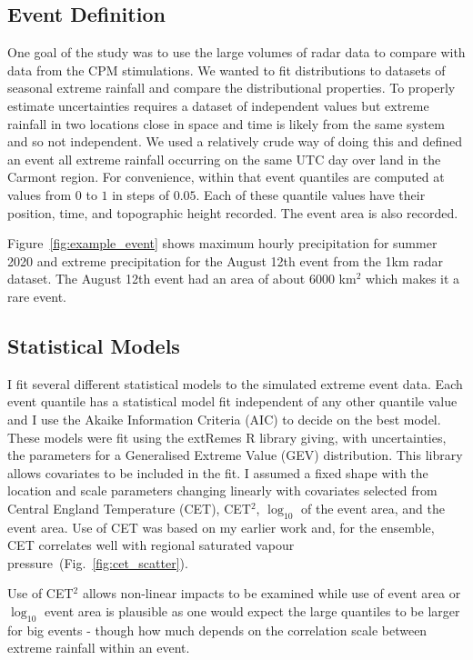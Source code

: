 \documentclass[11pt,a4paper]{article}
\begin{document}
\subsection{Event Definition}

One goal of the study was to use the large volumes of radar data to compare with data from the CPM stimulations. We  wanted  to fit distributions to  datasets of seasonal extreme rainfall and compare the distributional properties. To properly estimate uncertainties requires a dataset of independent values but extreme rainfall in two locations close in space and time is likely from the same system and so not independent. We used a relatively crude way of doing this and defined an event  all extreme rainfall occurring on the same UTC day over land in the Carmont region.  For convenience, within that event quantiles are computed at values from $0$ to $1$ in steps of $0.05$. Each of these quantile values have their position, time, and topographic height recorded. The event area is also recorded.  

Figure~\ref{fig:example_event} shows maximum hourly precipitation for summer 2020 and  extreme precipitation for the August 12th event from the 1km radar dataset. The August 12th event had an area of about 6000 km$^2$ which makes it a rare event. 


\subsection{Statistical Models}

I fit several different statistical models to the simulated  extreme event data. Each event quantile has a  statistical model fit independent of any other quantile value and I use the Akaike Information Criteria (AIC) to decide on the best model\parencite{akaike74aic}. These models were fit using the extRemes R library\parencite{gilleland2016extremes} giving, with uncertainties, the parameters for a Generalised Extreme Value (GEV) distribution.   This library allows covariates to be included in the fit. I assumed a fixed shape with the location and scale parameters changing linearly with covariates selected from  Central England Temperature (CET), CET$^2$,  $\log_{10}$ of the event area, and the event area.  Use of CET was based on my earlier work\parencite{tett2023edinburgh} and, for the ensemble, CET correlates well with regional saturated vapour pressure~(Fig.~\ref{fig:cet_scatter}). 

 
 Use of CET$^2$ allows non-linear impacts to be examined while use of  event area or $\log_{10}$ event area is plausible as one would expect the large quantiles to be larger for big events - though how much depends on the correlation scale between extreme rainfall within an event. 
\end{document}
